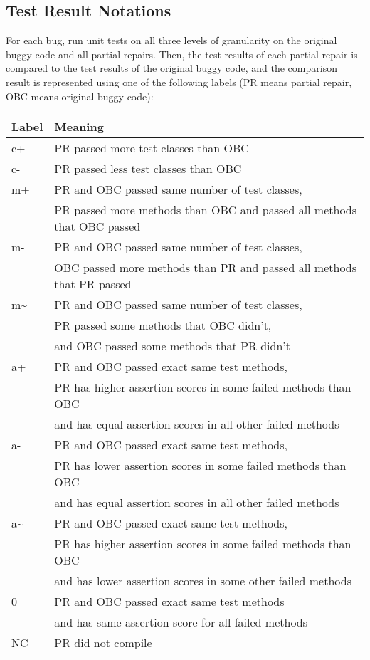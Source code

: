 \documentclass[sigconf, timestamp-false, anonymous=true]{acmart}
\begin{document}
\subsection{Test Result Notations}

For each bug, run unit tests on all three levels of granularity on the original buggy code and all partial repairs. Then, the test results of each partial repair is compared to the test results of the original buggy code, and the comparison result is represented using one of the following labels (PR means partial repair, OBC means original buggy code):

\begin{tabular}{| l | l |}
\hline
  Label & Meaning \\
  
  \hline
  c+ & PR passed more test classes than OBC  \\\hline
  c- & PR passed less test classes than OBC  \\\hline
  m+ & PR and OBC passed same number of test classes, \\
  & PR passed more methods than OBC and passed all methods that OBC passed\\\hline
  m- & PR and OBC passed same number of test classes, \\
  & OBC passed more methods than PR and passed all methods that PR passed\\\hline
  m\~ & PR and OBC passed same number of test classes, \\
  & PR passed some methods that OBC didn't, \\
  & and OBC passed some methods that PR didn't \\\hline
  a+ & PR and OBC passed exact same test methods, \\
  & PR has higher assertion scores in some failed methods than OBC \\
  & and has equal assertion scores in all other failed methods \\\hline
  a- & PR and OBC passed exact same test methods, \\
  & PR has lower assertion scores in some failed methods than OBC \\
  & and has equal assertion scores in all other failed methods \\\hline
  a\~ & PR and OBC passed exact same test methods, \\
  & PR has higher assertion scores in some failed methods than OBC \\
  & and has lower assertion scores in some other failed methods \\\hline
  0 & PR and OBC passed exact same test methods \\
  & and has same assertion score for all failed methods \\ \hline
  NC & PR did not compile \\\hline
 
  
\end{tabular}
\end{document}
